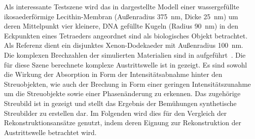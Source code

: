 Als interessante Testszene wird das in  dargestellte Modell einer wassergefüllte ikosaederförmige Lecithin-Membran (Außenradius \SI{375}{nm}, Dicke \SI{25}{nm}) um deren Mittelpunkt vier kleinere, DNA gefüllte Kugeln (Radius \SI{90}{nm}) in den Eckpunkten eines Tetraeders angeordnet sind als biologisches Objekt betrachtet. Als Referenz dient ein disjunktes Xenon-Dodekaeder mit Außenradius \SI{100}{nm}. Die komplexen Brechzahlen der simulierten Materialien sind in  aufgeführt~\cite{henke,bergh2008,milo2015}. Die für diese Szene berechnete komplexe Austrittswelle ist in  gezeigt. Es sind sowohl die Wirkung der Absorption in Form der Intensitätsabnahme hinter den Streuobjekten, wie auch der Brechung in Form einer geringen Intensitätszunahme um die Streuobjekte sowie einer Phasenänderung zu erkennen. Das zugehörige Streubild ist in  gezeigt und stellt das Ergebnis der Bemühungen synthetische Streubilder zu erstellen dar. Im Folgenden wird dies für den Vergleich der Rekonstruktionsansätze genutzt, indem deren Eignung zur Rekonstruktion der Austrittswelle betrachtet wird.


